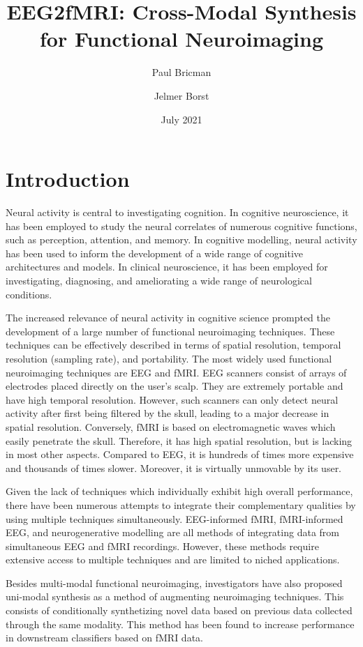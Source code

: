\documentclass{article}
\title{EEG2fMRI: Cross-Modal Synthesis for Functional Neuroimaging}
\author{Paul Bricman}
\author{Jelmer Borst}
\affil{University of Groningen}
\date{July 2021}
\begin{document}
\maketitle

\section{Introduction}

Neural activity is central to investigating cognition. In cognitive neuroscience, it has been employed to study the neural correlates of numerous cognitive functions, such as perception, attention, and memory. In cognitive modelling, neural activity has been used to inform the development of a wide range of cognitive architectures and models. In clinical neuroscience, it has been employed for investigating, diagnosing, and ameliorating a wide range of neurological conditions. 

The increased relevance of neural activity in cognitive science prompted the development of a large number of functional neuroimaging techniques. These techniques can be effectively described in terms of spatial resolution, temporal resolution (sampling rate), and portability. The most widely used functional neuroimaging techniques are EEG and fMRI. EEG scanners consist of arrays of electrodes placed directly on the user's scalp. They are extremely portable and have high temporal resolution. However, such scanners can only detect neural activity after first being filtered by the skull, leading to a major decrease in spatial resolution. Conversely, fMRI is based on electromagnetic waves which easily penetrate the skull. Therefore, it has high spatial resolution, but is lacking in most other aspects. Compared to EEG, it is hundreds of times more expensive and thousands of times slower. Moreover, it is virtually unmovable by its user.

Given the lack of techniques which individually exhibit high overall performance, there have been numerous attempts to integrate their complementary qualities by using multiple techniques simultaneously. EEG-informed fMRI, fMRI-informed EEG, and neurogenerative modelling are all methods of integrating data from simultaneous EEG and fMRI recordings. However, these methods require extensive access to multiple techniques and are limited to niched applications.

Besides multi-modal functional neuroimaging, investigators have also proposed uni-modal synthesis as a method of augmenting neuroimaging techniques. This consists of conditionally synthetizing novel data based on previous data collected through the same modality. This method has been found to increase performance in downstream classifiers based on fMRI data.
\end{document}
